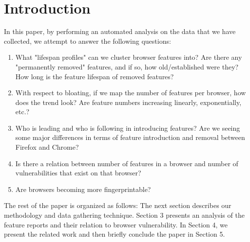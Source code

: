 \section{Introduction}
\label{sec:introduction}



In this paper, by performing an automated analysis on the data that we have collected, we attempt to answer
the following questions:

\begin{enumerate}
  \item What "lifespan profiles" can we cluster browser features into? Are there any "permanently removed" features, and if so, how old/established were they? How long is the feature lifespan of removed features?
  \item With respect to bloating, if we map the number of features per browser, how does the trend look? Are feature numbers increasing linearly, exponentially, etc.?
  \item Who is leading and who is following in introducing features? Are we seeing some major differences in terms of feature introduction and removal between Firefox and Chrome?
  \item Is there a relation between number of features in a browser and number of vulnerabilities that exist on that browser?
  \item Are browsers becoming more fingerprintable?
\end{enumerate}

The rest of the paper is organized as follows: The next section describes our
methodology and data gathering technique. Section 3 presents an analysis of the feature reports and their relation to browser vulnerability. In
Section 4, we present the related work and then briefly conclude the paper in
Section 5.

